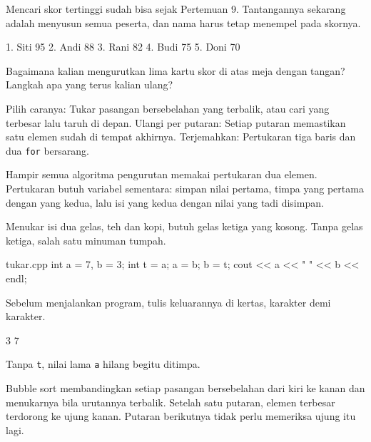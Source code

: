 \documentclass[a4paper]{article}
\begin{document}
Mencari skor tertinggi sudah bisa sejak Pertemuan 9. Tantangannya sekarang adalah menyusun semua peserta, dan nama harus tetap menempel pada skornya.

\begin{MKeluaran}[title={Tampilan yang diinginkan}]
1. Siti 95
2. Andi 88
3. Rani 82
4. Budi 75
5. Doni 70
\end{MKeluaran}
\begin{Tebak}
Bagaimana kalian mengurutkan lima kartu skor di atas meja dengan tangan? Langkah apa yang terus kalian ulang?
\end{Tebak}
\begin{Jawaban}
Pilih caranya: Tukar pasangan bersebelahan yang terbalik, atau cari yang terbesar lalu taruh di depan. Ulangi per putaran: Setiap putaran memastikan satu elemen sudah di tempat akhirnya. Terjemahkan: Pertukaran tiga baris dan dua \texttt{for} bersarang.
\end{Jawaban}
Hampir semua algoritma pengurutan memakai pertukaran dua elemen. Pertukaran butuh variabel sementara: simpan nilai pertama, timpa yang pertama dengan yang kedua, lalu isi yang kedua dengan nilai yang tadi disimpan.

\begin{Contoh}
Menukar isi dua gelas, teh dan kopi, butuh gelas ketiga yang kosong. Tanpa gelas ketiga, salah satu minuman tumpah.
\end{Contoh}
\begin{MKode}{tukar.cpp}
int a = 7, b = 3;
int t = a;
a = b;
b = t;
cout << a << " " << b << endl;
\end{MKode}
\begin{Tebak}[]
Sebelum menjalankan program, tulis keluarannya di kertas, karakter demi karakter.
\end{Tebak}
\begin{Jawaban}[]
\begin{MKeluaran}[]
3 7
\end{MKeluaran}
Tanpa \texttt{t}, nilai lama \texttt{a} hilang begitu ditimpa.
\end{Jawaban}
Bubble sort membandingkan setiap pasangan bersebelahan dari kiri ke kanan dan menukarnya bila urutannya terbalik. Setelah satu putaran, elemen terbesar terdorong ke ujung kanan. Putaran berikutnya tidak perlu memeriksa ujung itu lagi.
\end{document}
